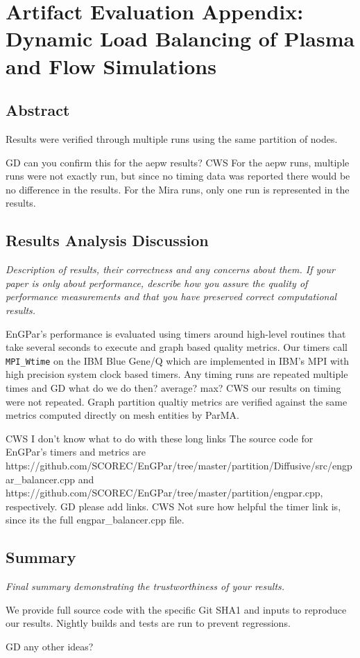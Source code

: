\section{Artifact Evaluation Appendix: Dynamic Load Balancing of Plasma and Flow Simulations}

\subsection{Abstract}

Results were verified through multiple runs using the same partition of nodes.

{\color{red} GD can you confirm this for the aepw results? CWS For the aepw runs, multiple runs
were not exactly run, but since no timing data was reported there would be no difference
in the results. For the Mira runs, only one run is represented in the results.}


\subsection{Results Analysis Discussion}

{\em Description of results, their correctness and any concerns about them. If your paper is only about performance, describe how you assure the quality of performance measurements and that you have preserved correct computational results.}

EnGPar's performance is evaluated using timers around high-level routines that
take several seconds to execute and graph based quality metrics.
Our timers call \texttt{MPI\_Wtime} on the IBM Blue Gene/Q which are implemented
in IBM's MPI with high precision system clock based timers.
Any timing runs are repeated multiple times and {\color{red} GD what do we do then? average?
max? CWS our results on timing were not repeated}.
Graph partition qualtiy metrics are verified against the same metrics computed
directly on mesh entities by ParMA.

{\color{red} CWS I don't know what to do with these long links}
The source code for EnGPar's timers and metrics are https://github.com/SCOREC/EnGPar/tree/master/partition/Diffusive/src/engpar\_balancer.cpp and https://github.com/SCOREC/EnGPar/tree/master/partition/engpar.cpp, respectively.
{\color{red} GD please add links. CWS Not sure how helpful the timer link is, since its the full engpar\_balancer.cpp file}.

\subsection{Summary}

{\em Final summary demonstrating the trustworthiness of your results.}

We provide full source code with the specific Git SHA1 and inputs to reproduce
our results.
Nightly builds and tests are run to prevent regressions.

{\color{red} GD any other ideas?}
